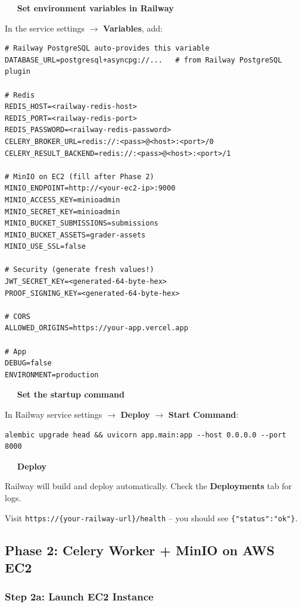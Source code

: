 \documentclass[12pt,a4paper]{article}
\newcounter{stepnum}
\newcommand{\step}[1]{%
  \stepcounter{stepnum}%
  \vspace{8pt}%
  \noindent\colorbox{setupCyan}{\color{white}\bfseries\small\ \thestepnum\ }%
  \hspace{4pt}\textbf{#1}%
  \par\vspace{2pt}%
}
\begin{document}
\step{Set environment variables in Railway}

In the service settings $\rightarrow$ \textbf{Variables}, add:

\begin{lstlisting}[style=envfile]
# Railway PostgreSQL auto-provides this variable
DATABASE_URL=postgresql+asyncpg://...   # from Railway PostgreSQL plugin

# Redis
REDIS_HOST=<railway-redis-host>
REDIS_PORT=<railway-redis-port>
REDIS_PASSWORD=<railway-redis-password>
CELERY_BROKER_URL=redis://:<pass>@<host>:<port>/0
CELERY_RESULT_BACKEND=redis://:<pass>@<host>:<port>/1

# MinIO on EC2 (fill after Phase 2)
MINIO_ENDPOINT=http://<your-ec2-ip>:9000
MINIO_ACCESS_KEY=minioadmin
MINIO_SECRET_KEY=minioadmin
MINIO_BUCKET_SUBMISSIONS=submissions
MINIO_BUCKET_ASSETS=grader-assets
MINIO_USE_SSL=false

# Security (generate fresh values!)
JWT_SECRET_KEY=<generated-64-byte-hex>
PROOF_SIGNING_KEY=<generated-64-byte-hex>

# CORS
ALLOWED_ORIGINS=https://your-app.vercel.app

# App
DEBUG=false
ENVIRONMENT=production
\end{lstlisting}

\step{Set the startup command}

In Railway service settings $\rightarrow$ \textbf{Deploy} $\rightarrow$ \textbf{Start Command}:
\begin{lstlisting}[style=terminal]
alembic upgrade head && uvicorn app.main:app --host 0.0.0.0 --port 8000
\end{lstlisting}

\step{Deploy}

Railway will build and deploy automatically. Check the \textbf{Deployments} tab for logs.

\begin{successbox}
  Visit \texttt{https://\{your-railway-url\}/health} -- you should see \texttt{\{"status":"ok"\}}.
\end{successbox}

\subsection{Phase 2: Celery Worker + MinIO on AWS EC2}

\subsubsection{Step 2a: Launch EC2 Instance}
\end{document}

